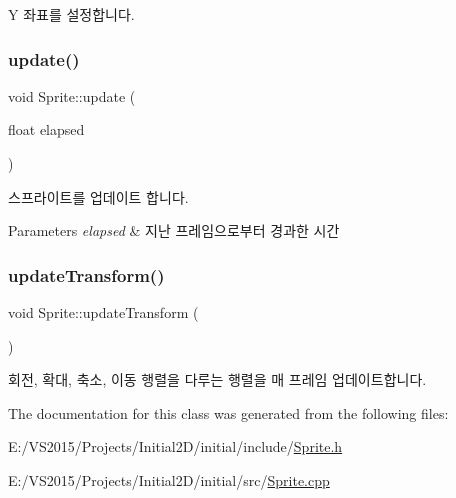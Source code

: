 Y 좌표를 설정합니다. \mbox{\label{class_sprite_a8552f93511e6f0957c7f763104193afb}} 
\subsubsection{\texorpdfstring{update()}{update()}}
{\footnotesize\ttfamily void Sprite\+::update (\begin{DoxyParamCaption}\item[{float}]{elapsed }\end{DoxyParamCaption})\hspace{0.3cm}{\ttfamily [virtual]}}

스프라이트를 업데이트 합니다.


\begin{DoxyParams}{Parameters}
{\em elapsed} & 지난 프레임으로부터 경과한 시간 \\
\hline
\end{DoxyParams}
\mbox{\label{class_sprite_aaa9e697dce4d8e28391735496c864867}} 
\subsubsection{\texorpdfstring{updateTransform()}{updateTransform()}}
{\footnotesize\ttfamily void Sprite\+::update\+Transform (\begin{DoxyParamCaption}{ }\end{DoxyParamCaption})\hspace{0.3cm}{\ttfamily [virtual]}}

회전, 확대, 축소, 이동 행렬을 다루는 행렬을 매 프레임 업데이트합니다. 

The documentation for this class was generated from the following files\+:\begin{DoxyCompactItemize}
\item 
E\+:/\+V\+S2015/\+Projects/\+Initial2\+D/initial/include/\mbox{\hyperlink{_sprite_8h}{Sprite.\+h}}\item 
E\+:/\+V\+S2015/\+Projects/\+Initial2\+D/initial/src/\mbox{\hyperlink{_sprite_8cpp}{Sprite.\+cpp}}\end{DoxyCompactItemize}

